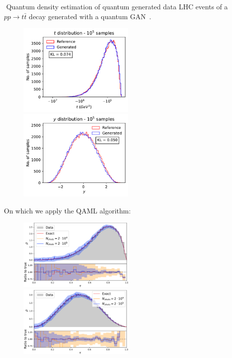 \documentclass[20pt, final]{beamer}
\newlength{\colwidth}
\begin{document}
\begin{frame}[t]
\begin{columns}[t]
\begin{column}{\colwidth}
  \begin{block}{\faMagic\,\,Quantum density estimation of quantum generated data}
  LHC events of a $pp\to t\bar{t}$ decay generated with a quantum 
  GAN~\cite{Bravo_Prieto_2022}. 
    \begin{figure}
    \includegraphics[width=0.5\textwidth]{figures/t_qgan.pdf}%
    \includegraphics[width=0.5\textwidth]{figures/y_qgan.pdf}%
    \end{figure}
  On which we apply the QAML algorithm:
    \begin{figure}
    \includegraphics[width=0.5\textwidth]{figures/t.pdf}%
    \includegraphics[width=0.5\textwidth]{figures/rapidity.pdf}%
    \end{figure}
    

\end{block}
\end{column}
\end{columns}
\end{frame}
\end{document}
